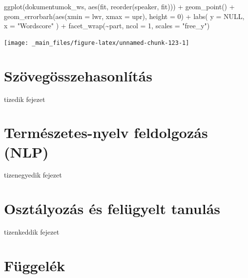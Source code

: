 \documentclass[
]{book}
\newenvironment{Shaded}{\begin{snugshade}}{\end{snugshade}}
\newcommand{\AttributeTok}[1]{\textcolor[rgb]{0.77,0.63,0.00}{#1}}
\newcommand{\ConstantTok}[1]{\textcolor[rgb]{0.00,0.00,0.00}{#1}}
\newcommand{\DecValTok}[1]{\textcolor[rgb]{0.00,0.00,0.81}{#1}}
\newcommand{\FunctionTok}[1]{\textcolor[rgb]{0.00,0.00,0.00}{#1}}
\newcommand{\NormalTok}[1]{#1}
\newcommand{\SpecialCharTok}[1]{\textcolor[rgb]{0.00,0.00,0.00}{#1}}
\newcommand{\StringTok}[1]{\textcolor[rgb]{0.31,0.60,0.02}{#1}}
\begin{document}
\begin{Shaded}
\begin{Highlighting}[]

\FunctionTok{ggplot}\NormalTok{(dokumentumok\_ws, }\FunctionTok{aes}\NormalTok{(fit, }\FunctionTok{reorder}\NormalTok{(speaker, fit))) }\SpecialCharTok{+}
  \FunctionTok{geom\_point}\NormalTok{() }\SpecialCharTok{+}
  \FunctionTok{geom\_errorbarh}\NormalTok{(}\FunctionTok{aes}\NormalTok{(}\AttributeTok{xmin =}\NormalTok{ lwr, }\AttributeTok{xmax =}\NormalTok{ upr), }\AttributeTok{height =} \DecValTok{0}\NormalTok{) }\SpecialCharTok{+}
  \FunctionTok{labs}\NormalTok{(}
    \AttributeTok{y =} \ConstantTok{NULL}\NormalTok{,}
    \AttributeTok{x =} \StringTok{"Wordscore"}
\NormalTok{  ) }\SpecialCharTok{+}
  \FunctionTok{facet\_wrap}\NormalTok{(}\SpecialCharTok{\textasciitilde{}}\NormalTok{part, }\AttributeTok{ncol =} \DecValTok{1}\NormalTok{, }\AttributeTok{scales =} \StringTok{"free\_y"}\NormalTok{)}
\end{Highlighting}
\end{Shaded}

\begin{center}\texttt{[image: \_main\_files/figure-latex/unnamed-chunk-123-1]} \end{center}

\hypertarget{szuxf6veguxf6sszehasonluxedtuxe1s}{%
\chapter{Szövegösszehasonlítás}\label{szuxf6veguxf6sszehasonluxedtuxe1s}}

tizedik fejezet

\hypertarget{termuxe9szetes-nyelv-feldolgozuxe1s-nlp}{%
\chapter{Természetes-nyelv feldolgozás
(NLP)}\label{termuxe9szetes-nyelv-feldolgozuxe1s-nlp}}

tizenegyedik fejezet

\hypertarget{osztuxe1lyozuxe1s-uxe9s-feluxfcgyelt-tanuluxe1s}{%
\chapter{Osztályozás és felügyelt
tanulás}\label{osztuxe1lyozuxe1s-uxe9s-feluxfcgyelt-tanuluxe1s}}

tizenkeddik fejezet

\hypertarget{fuxfcggeluxe9k}{%
\chapter{Függelék}\label{fuxfcggeluxe9k}}
\end{document}

